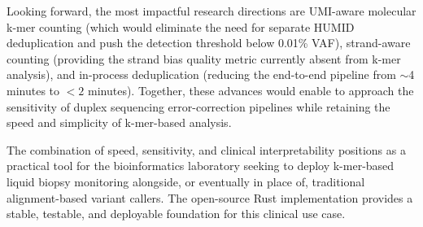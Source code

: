 Looking forward, the most impactful research directions are UMI-aware molecular
k-mer counting (which would eliminate the need for separate HUMID deduplication
and push the detection threshold below 0.01\% VAF), strand-aware counting
(providing the strand bias quality metric currently absent from k-mer analysis),
and in-process deduplication (reducing the end-to-end pipeline from $\sim$4
minutes to $<2$ minutes).  Together, these advances would enable \kmerdet{} to
approach the sensitivity of duplex sequencing error-correction pipelines while
retaining the speed and simplicity of k-mer-based analysis.

The combination of speed, sensitivity, and clinical interpretability positions
\kmerdet{} as a practical tool for the bioinformatics laboratory seeking to
deploy k-mer-based liquid biopsy monitoring alongside, or eventually in place of,
traditional alignment-based variant callers.  The open-source Rust implementation
provides a stable, testable, and deployable foundation for this clinical use case.
